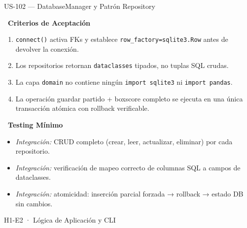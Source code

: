 \documentclass[11pt,a4paper]{article}
\newcommand{\fpath}[1]{\texttt{\small #1}}
\newcommand{\usfield}[2][\;]{%
  \par\vspace{5pt}%
  {\small\textbf{\textcolor{primary}{#2}}}\par\vspace{2pt}%
}
\begin{document}
\begin{uscard}{US-102 — DatabaseManager y Patrón Repository}
\usfield{\faCheckCircle\ Criterios de Aceptación}
\begin{enumerate}[label=\textcolor{accent}{\textbf{AC\arabic*.}}, nosep, leftmargin=2.2em]
  \item \fpath{connect()} activa FKs y establece \fpath{row\_factory=sqlite3.Row} antes de devolver la conexión.
  \item Los repositorios retornan \fpath{dataclasses} tipados, no tuplas SQL crudas.
  \item La capa \fpath{domain} no contiene ningún \fpath{import sqlite3} ni \fpath{import pandas}.
  \item La operación guardar partido + boxscore completo se ejecuta en una única transacción atómica con rollback verificable.
\end{enumerate}

\usfield{\faFlask\ Testing Mínimo}
\begin{itemize}[nosep, leftmargin=1.6em]
  \item \textit{Integración:} CRUD completo (crear, leer, actualizar, eliminar) por cada repositorio.
  \item \textit{Integración:} verificación de mapeo correcto de columnas SQL a campos de dataclasses.
  \item \textit{Integración:} atomicidad: inserción parcial forzada → rollback → estado DB sin cambios.
\end{itemize}

\end{uscard}

\begin{epicbox}{H1-E2 · Lógica de Aplicación y CLI}
\end{epicbox}
\end{document}
